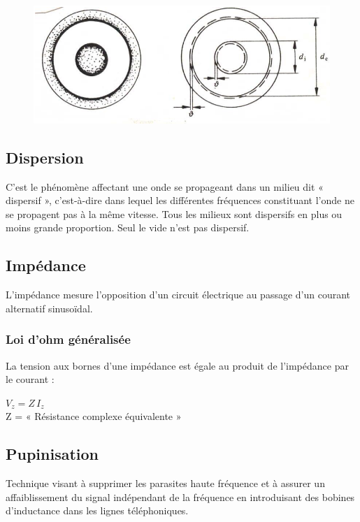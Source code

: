 \documentclass[12pt]{article}
\begin{document}
\begin{figure}[H]
\centering
\includegraphics[scale=0.5]{images/EffetPelliculaire.png}
\end{figure}

\subsection{Dispersion}

C'est le phénomène affectant une onde se propageant dans un milieu dit « dispersif », c'est-à-dire dans lequel les différentes fréquences constituant l'onde ne se propagent pas à la même vitesse. Tous les milieux sont dispersifs en plus ou moins grande proportion. Seul le vide n'est pas dispersif.

\subsection{Impédance}

L'impédance mesure l'opposition d'un circuit électrique au passage d'un courant alternatif sinusoïdal.

\subsubsection{Loi d'ohm généralisée}

La tension aux bornes d'une impédance est égale au produit de l'impédance par le courant :
\begin{center}
$ V_z=Z\,I_z\,  $\\
Z = « Résistance complexe équivalente »
\end{center}

\subsection{Pupinisation}

Technique visant à supprimer les parasites haute fréquence et à assurer un affaiblissement du signal indépendant de la fréquence en introduisant des bobines d'inductance dans les lignes téléphoniques.
\end{document}
